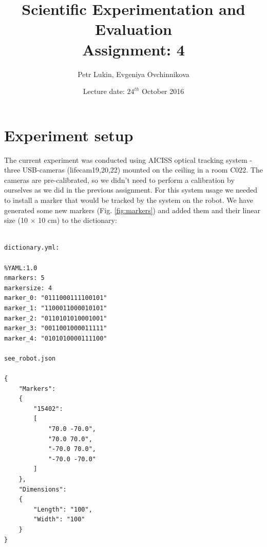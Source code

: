 \documentclass[a4paper, 12pt]{article}
\title{Scientific Experimentation and Evaluation  \\
				Assignment: 4}
\author{Petr Lukin, Evgeniya Ovchinnikova}
\date{Lecture date: $24^{th}$ October 2016}
\begin{document}



\maketitle

\section{Experiment setup}

The current experiment was conducted using AICISS optical tracking system - three USB-cameras (lifecam19,20,22) mounted on the ceiling in a room C022. The cameras are pre-calibrated, so we didn't need to perform a calibration by ourselves as we did in the previous assignment. For this system usage we needed to install a marker that would be tracked by the system on the robot. We have generated some new markers (Fig. \ref{fig:markers}) and added them and their linear size (10 $\times$ 10 cm) to the dictionary:

\begin{lstlisting}

dictionary.yml:

%YAML:1.0
nmarkers: 5
markersize: 4
marker_0: "0111000111100101"
marker_1: "1100011000010101"
marker_2: "0110101010001001"
marker_3: "0011001000011111"
marker_4: "0101010000111100"

see_robot.json

{
    "Markers":
    {
        "15402":
        [
            "70.0 -70.0",
            "70.0 70.0",
            "-70.0 70.0",
            "-70.0 -70.0"
        ]
    },
    "Dimensions":
    {
        "Length": "100",
        "Width": "100"
    }
}

\end{lstlisting}
\end{document}
